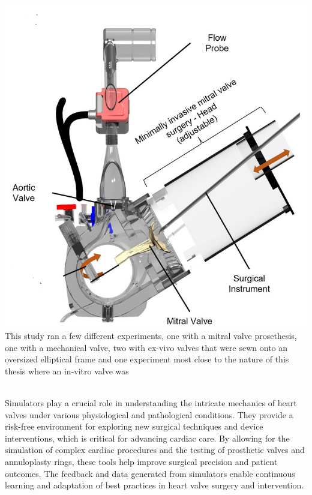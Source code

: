 \begin{itemize}
{              \includegraphics[width=\linewidth]{figures/karl1.jpg}
              \label{fig:k2}
          }
          This study ran a few different experiments, one with a mitral valve prosethesis, one with a mechanical valve, two with ex-vivo valves that were sewn onto an oversized elliptical frame and one experiment most close to the nature of this thesis where an in-vitro valve was
\end{itemize}
\\
Simulators play a crucial role in understanding the intricate mechanics of heart valves under various physiological and pathological conditions. They provide a risk-free environment for exploring new surgical techniques and device interventions, which is critical for advancing cardiac care. By allowing for the simulation of complex cardiac procedures and the testing of prosthetic valves and annuloplasty rings, these tools help improve surgical precision and patient outcomes. The feedback and data generated from simulators enable continuous learning and adaptation of best practices in heart valve surgery and intervention.

